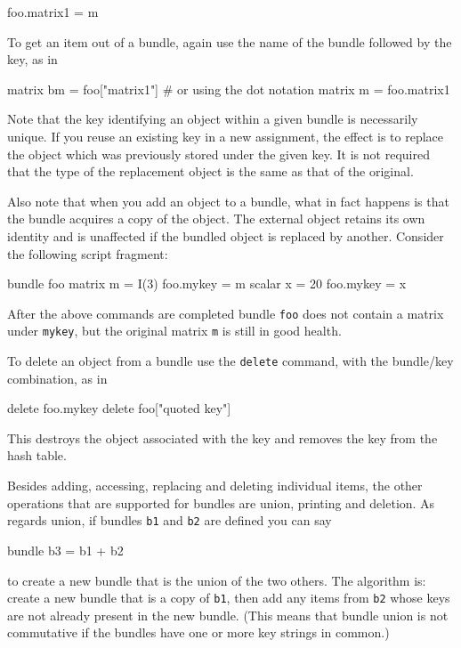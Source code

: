 \begin{code}
foo.matrix1 = m
\end{code}

To get an item out of a bundle, again use the name of the bundle
followed by the key, as in

\begin{code}
matrix bm = foo["matrix1"]
# or using the dot notation
matrix m = foo.matrix1
\end{code}

Note that the key identifying an object within a given bundle is
necessarily unique. If you reuse an existing key in a new assignment,
the effect is to replace the object which was previously stored under
the given key. It is not required that the type of the replacement
object is the same as that of the original.

Also note that when you add an object to a bundle, what in fact
happens is that the bundle acquires a copy of the object. The external
object retains its own identity and is unaffected if the bundled
object is replaced by another. Consider the following script fragment:

\begin{code}
bundle foo
matrix m = I(3)
foo.mykey = m
scalar x = 20
foo.mykey = x
\end{code}

After the above commands are completed bundle \texttt{foo} does not
contain a matrix under \texttt{mykey}, but the original matrix
\texttt{m} is still in good health.

To delete an object from a bundle use the \texttt{delete} command,
with the bundle/key combination, as in

\begin{code}
delete foo.mykey
delete foo["quoted key"]
\end{code}

This destroys the object associated with the key and removes the key
from the hash table.

Besides adding, accessing, replacing and deleting individual items,
the other operations that are supported for bundles are union,
printing and deletion. As regards union, if bundles \texttt{b1} and
\texttt{b2} are defined you can say

\begin{code}
bundle b3 = b1 + b2
\end{code}

to create a new bundle that is the union of the two others. The
algorithm is: create a new bundle that is a copy of \texttt{b1}, then
add any items from \texttt{b2} whose keys are not already present in
the new bundle. (This means that bundle union is not commutative if
the bundles have one or more key strings in common.)

